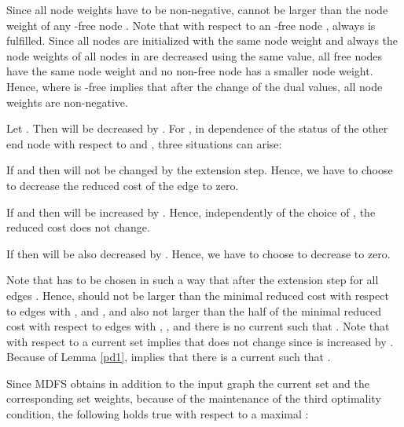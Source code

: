\documentclass[12pt,twoside,a4paper]{article}
\begin{document}
Since all node weights have to be non-negative,  cannot be larger 
than the node weight of any -free node . Note that with respect to an -free
node , always  is fulfilled. Since all nodes are initialized with the same 
node weight and always the node weights of all nodes in  are decreased using the same 
value, all free nodes have the same node weight and no non-free node has a smaller node weight.
Hence,  where  is -free implies that after the 
change of the dual values, all node weights are non-negative.

Let . Then  will be decreased by . For , 
in dependence of the status of the other end node  with respect to  and , 
three situations can arise:

If  and  then  will not be changed by the
extension step. Hence, we have to choose  
to decrease the reduced cost  of the edge  to zero.
 
If  and  then  will be increased by .
Hence, independently of the choice of , the reduced cost  does not change.

If  then  will be also decreased by . Hence, we have to 
choose  to decrease  to zero.

Note that  has to be chosen in such a way that after the extension step
 for all edges . Hence,  should not be 
larger than the minimal reduced cost with respect to edges  with
,  and , and also not larger than 
the half of the minimal reduced cost with respect to edges  with 
, , and there is no current  such that 
. Note that  with respect to a current set
 implies that  does not change since  is increased by 
. Because of Lemma \ref{pd1},  implies that there is a current 
 such that .

Since MDFS obtains in addition to the input graph the current set  and the  
corresponding set weights, because of the maintenance of the third optimality 
condition, the following holds true with respect to a maximal :
\end{document}
